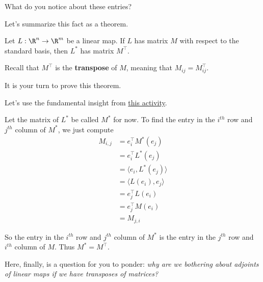 \documentclass{ximera}
\begin{document}
\begin{question}
  What do you notice about these entries?
  \begin{solution}
    \begin{multiple-choice}
    \end{multiple-choice}
  \end{solution}
  
  Let's summarize this fact as a theorem.
  \begin{theorem}
    Let $L: \R^n \to \R^m$ be a linear map.
    If $L$ has matrix $M$ with respect to the standard basis, then $L^*$ has matrix $M^\top$.    
  \end{theorem}
  
  Recall that $M^\top$ is the \textbf{transpose} of $M$, meaning that $M_{ij} = M^\top_{ij}$.
  
  It is your turn to prove this theorem.
  
  \begin{free-response}
    Let's use the fundamental insight from \href{http://ximera.osu.edu/course/kisonecat/m2o2c2/course/activity/week1/inner-product/multiply-dot/}{this activity}.  
    
    Let the matrix of $L^*$ be called $M^*$ for now.
    To find the entry in the $i^{th}$ row and $j^{th}$ column of $M^*$, we just  compute 
    \begin{align*}
      M_{i,j} &= e_i^\top M^*(e_j)\\
      &=e_i^\top L^*(e_j)\\
      &= \langle e_i , L^*(e_j)\rangle\\
      &= \langle  L(e_i), e_j \rangle\\
      &=e_j^\top L(e_i)\\
      &=e_j^\top M(e_i)\\
      &= M_{j,i}
    \end{align*}
    
    So the entry  in the $i^{th}$ row and $j^{th}$ column of $M^*$ is the entry in the $j^{th}$ row and $i^{th}$ column of $M$.  Thus $M^* = M^\top$.
  \end{free-response}
  
  Here, finally, is a question for you to ponder: \textit{why are we bothering about adjoints of linear maps if we have transposes of matrices?}
  
\end{question}

	
\end{document}
